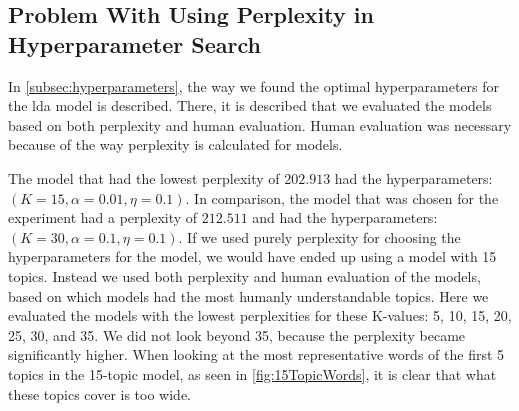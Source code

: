 \subsection{Problem With Using Perplexity in Hyperparameter Search}
In \autoref{subsec:hyperparameters}, the way we found the optimal hyperparameters for the \gls{lda} model is described.
There, it is described that we evaluated the models based on both perplexity and human evaluation.
Human evaluation was necessary because of the way perplexity is calculated for models.

The model that had the lowest perplexity of $202.913$ had the hyperparameters: $(K=15, \alpha =0.01, \eta =0.1)$.
In comparison, the model that was chosen for the experiment had a perplexity of $212.511$ and had the hyperparameters: $(K=30, \alpha =0.1, \eta =0.1)$.
If we used purely perplexity for choosing the hyperparameters for the model, we would have ended up using a model with 15 topics.
Instead we used both perplexity and human evaluation of the models, based on which models had the most humanly understandable topics.
Here we evaluated the models with the lowest perplexities for these K-values: 5, 10, 15, 20, 25, 30, and 35.
We did not look beyond 35, because the perplexity became significantly higher.
When looking at the most representative words of the first 5 topics in the 15-topic model, as seen in \autoref{fig:15TopicWords}, it is clear that what these topics cover is too wide.

